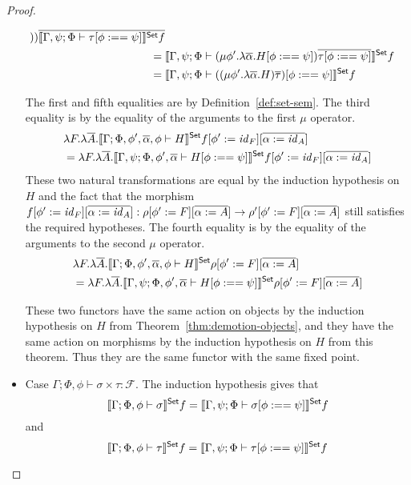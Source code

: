 \documentclass[acmsmall,review,anonymous]{acmart}
\theoremstyle{definition}
\newcommand{\F}{\mathcal{F}}
\newcommand{\set}{\mathsf{Set}}
\renewcommand{\id}{\mathit{id}}
\begin{document}
\begin{proof}
\begin{itemize}
\begin{align*}
          )
        ) \ol{\setsem{ \Gamma, \psi; \Phi \vdash \tau[\phi :== \psi]} f} \\
        = \; & \setsem{\Gamma, \psi; \Phi \vdash (\mu \phi'. \lambda \ol\alpha. H[\phi :== \psi]) \ol{\tau[\phi :== \psi]} } f \\
        = \; & \setsem{\Gamma, \psi; \Phi \vdash ((\mu \phi'. \lambda \ol\alpha. H) \ol\tau)[\phi :== \psi] } f
      \end{align*} 

      \noindent
      The first and fifth equalities are by Definition~\ref{def:set-sem}.
      The third equality is by the equality of the arguments to the first $\mu$ operator. 
      \begin{align*}
        & \lambda F. \lambda \ol{A}. \setsem{\Gamma; \Phi, \phi', \ol{\alpha}, \phi \vdash H} f [\phi' := \id_F][\ol{\alpha := \id_A}] \\
        & = \lambda F. \lambda \ol{A}. \setsem{\Gamma, \psi; \Phi, \phi', \ol{\alpha} \vdash H[\phi :== \psi]} f [\phi' := \id_F][\ol{\alpha := \id_A}]
      \end{align*}
      These two natural transformations are equal by the induction hypothesis on $H$ and the fact that the morphism $f[\phi' := \id_F][\ol{\alpha := \id_A}]
      : \rho[\phi' := F][\ol{\alpha := A}] \to \rho'[\phi' := F][\ol{\alpha := A}]$
      still satisfies the required hypotheses.
      The fourth equality is by the equality of the arguments to the second $\mu$ operator. 
      \begin{align*}
        & \lambda F. \lambda \ol{A}. \setsem{\Gamma; \Phi, \phi', \ol{\alpha}, \phi \vdash H} \rho[\phi' := F][\ol{\alpha := A}] \\
        & = \lambda F. \lambda \ol{A}. \setsem{\Gamma, \psi; \Phi, \phi', \ol{\alpha} \vdash H[\phi :== \psi]} \rho[\phi' := F][\ol{\alpha := A}]
      \end{align*}

      These two functors have the same action on objects by the induction hypothesis on $H$ from Theorem~\ref{thm:demotion-objects},
      and they have the same action on morphisms by the induction hypothesis on $H$ from this theorem. 
      Thus they are the same functor with the same fixed point.

  \item Case $\Gamma; \Phi, \phi \vdash \sigma \times \tau : \F$. The induction hypothesis gives that 
      $$\setsem{\Gamma; \Phi, \phi \vdash \sigma } f
        = \setsem{\Gamma, \psi; \Phi \vdash \sigma[\phi :== \psi] } f$$ 
        and
      $$\setsem{\Gamma; \Phi, \phi \vdash \tau } f
        = \setsem{\Gamma, \psi; \Phi \vdash \tau[\phi :== \psi] } f$$ 


\end{itemize}
\end{proof}
\end{document}
